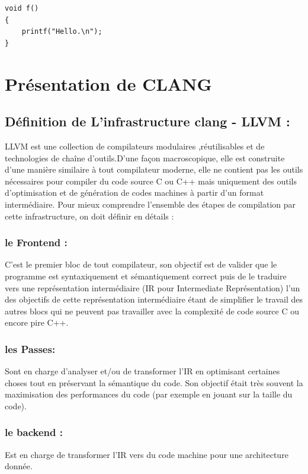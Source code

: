 \documentclass[12pt,titlepage]{article}
\begin{document}
\begin{lstlisting}
void f()
{
    printf("Hello.\n");
}
\end{lstlisting}

\section{Présentation de CLANG} \cite{clangllvm}

\subsection{ Définition de  L’infrastructure clang - LLVM :} 
LLVM est une collection de compilateurs modulaires ,réutilisables et de technologies de chaîne d'outils.D’une façon macroscopique, elle est construite d’une manière similaire à tout compilateur moderne, elle ne contient pas les outils nécessaires pour compiler du code source C ou C++ mais uniquement des outils d’optimisation et de génération de codes machines à partir d’un format intermédiaire. 
 Pour mieux comprendre l’ensemble des étapes de compilation par cette infrastructure,   on doit définir en détails :
       
     \subsubsection{  le Frontend : }
     C'est le premier bloc de tout compilateur, son objectif est de valider que le programme est syntaxiquement et sémantiquement correct puis de le traduire vers une représentation intermédiaire (IR pour Intermediate Représentation) l'un des objectifs de cette représentation intermédiaire étant de simplifier le travail des autres blocs qui ne peuvent pas travailler avec la complexité de code source C ou encore pire C++. 

     \subsubsection{ les Passes: }
     Sont en charge d’analyser et/ou de transformer l’IR en optimisant certaines choses tout en préservant la sémantique du code. Son objectif était très souvent la maximisation des performances du code (par exemple en jouant sur la taille du code).

    \subsubsection{ le backend :}
    Est en charge de transformer l’IR vers du code machine pour une architecture donnée.
\end{document}

